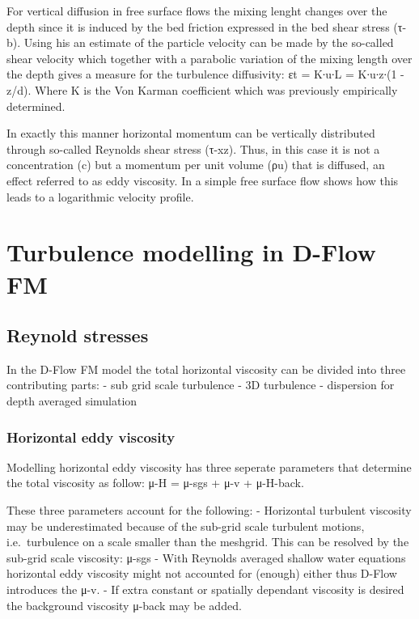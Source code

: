 For vertical diffusion in free surface flows the mixing lenght changes
over the depth since it is induced by the bed friction expressed in the
bed shear stress (τ-b). Using his an estimate of the particle velocity
can be made by the so-called shear velocity which together with a
parabolic variation of the mixing length over the depth gives a measure
for the turbulence diffusivity: εt = Κ∙u∙L = Κ∙u∙z∙(1 - z/d). Where Κ is
the Von Karman coefficient which was previously empirically determined.

In exactly this manner horizontal momentum can be vertically distributed
through so-called Reynolds shear stress (τ-xz). Thus, in this case it is
not a concentration (c) but a momentum per unit volume (ρu) that is
diffused, an effect referred to as eddy viscosity. In a simple free
surface flow \citep[p.199]{Vuik2007} shows how this leads to a
logarithmic velocity profile.

\section{Turbulence modelling in D-Flow
FM}\label{turbulence-modelling-in-d-flow-fm}

\subsection{Reynold stresses}\label{reynold-stresses}

In the D-Flow FM model the total horizontal viscosity can be divided
into three contributing parts: - sub grid scale turbulence - 3D
turbulence - dispersion for depth averaged simulation

\subsubsection{Horizontal eddy
viscosity}\label{horizontal-eddy-viscosity}

Modelling horizontal eddy viscosity has three seperate parameters that
determine the total viscosity as follow: μ-H = μ-sgs + μ-v + μ-H-back.

These three parameters account for the following: - Horizontal turbulent
viscosity may be underestimated because of the sub-grid scale turbulent
motions, i.e.~turbulence on a scale smaller than the meshgrid. This can
be resolved by the sub-grid scale viscosity: μ-sgs - With Reynolds
averaged shallow water equations horizontal eddy viscosity might not
accounted for (enough) either thus D-Flow introduces the μ-v. - If extra
constant or spatially dependant viscosity is desired the background
viscosity μ-back may be added.

